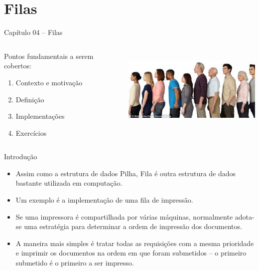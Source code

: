 \section{Filas}

\begin{frame}

\begin{center}
{\Large Capítulo 04 -- Filas}
\end{center}

\begin{columns}
\begin{column}{.4\textwidth}
\centering
Pontos fundamentais a serem cobertos:
  \begin{enumerate}
  \item Contexto e motivação
  \item Definição
  \item Implementações
  \item Exercícios 
\end{enumerate}  

\end{column}

\begin{column}{.6\textwidth}
\centering
\includegraphics[height=4cm, width=7cm]{figs/fig_filas/fila_pessoas.jpeg}
\end{column}

\end{columns}


\end{frame}


  \begin{frame}{Introdução}    

		\begin{itemize}
			\item Assim como a estrutura de dados Pilha, Fila é outra estrutura de dados 
			bastante utilizada em computação.
			\item Um exemplo é a implementação de uma fila de impressão.
			\item Se uma impressora é compartilhada por várias máquinas, 
			normalmente adota-se uma estratégia para determinar a ordem de impressão dos documentos.
			\item A maneira mais simples é tratar todas as requisições 
			com a mesma prioridade e imprimir os documentos na ordem em que 
			foram submetidos -- o primeiro submetido é o primeiro a ser impresso.
		\end{itemize}
  \end{frame}

